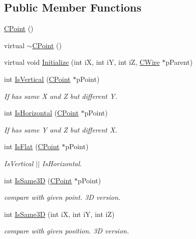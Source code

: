 \subsection*{Public Member Functions}
\begin{DoxyCompactItemize}
\item 
\mbox{\hyperlink{classCPoint_afce98ba89f4a9283c9d1c94571ca70f2}{C\+Point}} ()
\item 
virtual \mbox{\hyperlink{classCPoint_a1f368b093ec85c9ee8ec3da805aa1d47}{$\sim$\+C\+Point}} ()
\item 
virtual void \mbox{\hyperlink{classCPoint_a763a48a1efdcdaea63cfa4a9be8c4c48}{Initialize}} (int iX, int iY, int iZ, \mbox{\hyperlink{classCWire}{C\+Wire}} $\ast$p\+Parent)
\item 
int \mbox{\hyperlink{classCPoint_a888633c67f146c390bd3434850497f1f}{Is\+Vertical}} (\mbox{\hyperlink{classCPoint}{C\+Point}} $\ast$p\+Point)
\begin{DoxyCompactList}\small\item\em If has same X and Z but different Y. \end{DoxyCompactList}\item 
int \mbox{\hyperlink{classCPoint_a44e549d9e95bb88d0abbe614ab5f1435}{Is\+Horizontal}} (\mbox{\hyperlink{classCPoint}{C\+Point}} $\ast$p\+Point)
\begin{DoxyCompactList}\small\item\em If has same Y and Z but different X. \end{DoxyCompactList}\item 
int \mbox{\hyperlink{classCPoint_a8177f7cd02cfad8b3ac91ebf0b7c8eee}{Is\+Flat}} (\mbox{\hyperlink{classCPoint}{C\+Point}} $\ast$p\+Point)
\begin{DoxyCompactList}\small\item\em Is\+Vertical $\vert$$\vert$ Is\+Horizontal. \end{DoxyCompactList}\item 
int \mbox{\hyperlink{classCPoint_a5a759d36a6b0bb0e8300077f53924362}{Is\+Same3D}} (\mbox{\hyperlink{classCPoint}{C\+Point}} $\ast$p\+Point)
\begin{DoxyCompactList}\small\item\em compare with given point. 3D version. \end{DoxyCompactList}\item 
int \mbox{\hyperlink{classCPoint_ad6ed4f9141fd7ec648cb508bffe7edc2}{Is\+Same3D}} (int iX, int iY, int iZ)
\begin{DoxyCompactList}\small\item\em compare with given position. 3D version. \end{DoxyCompactList}\item 

\end{DoxyCompactItemize}
